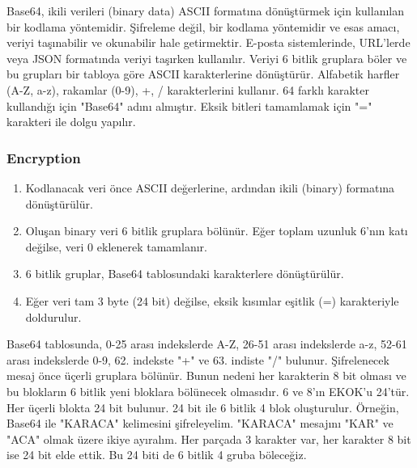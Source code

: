 Base64, ikili verileri (binary data) ASCII formatına dönüştürmek için kullanılan bir kodlama yöntemidir. Şifreleme değil, bir kodlama yöntemidir ve esas amacı, veriyi taşınabilir ve okunabilir hale getirmektir. E-posta sistemlerinde, URL'lerde veya JSON formatında veriyi taşırken kullanılır. Veriyi 6 bitlik gruplara böler ve bu grupları bir tabloya göre ASCII karakterlerine dönüştürür. Alfabetik harfler (A-Z, a-z), rakamlar (0-9), +, / karakterlerini kullanır. 64 farklı karakter kullandığı için "Base64" adını almıştır. Eksik bitleri tamamlamak için "=" karakteri ile dolgu yapılır.

\subsubsection{Encryption}

\begin{enumerate}
    \item Kodlanacak veri önce ASCII değerlerine, ardından ikili (binary) formatına dönüştürülür.
    \item Oluşan binary veri 6 bitlik gruplara bölünür. Eğer toplam uzunluk 6'nın katı değilse, veri 0 eklenerek tamamlanır. 
    \item 6 bitlik gruplar, Base64 tablosundaki karakterlere dönüştürülür.
    \item Eğer veri tam 3 byte (24 bit) değilse, eksik kısımlar eşitlik (=) karakteriyle doldurulur.
\end{enumerate}

Base64 tablosunda, 0-25 arası indekslerde A-Z, 26-51 arası indekslerde a-z, 52-61 arası indekslerde 0-9, 62. indekste "+" ve 63. indiste "/" bulunur. Şifrelenecek mesaj önce üçerli gruplara bölünür. Bunun nedeni her karakterin 8 bit olması ve bu blokların 6 bitlik yeni bloklara bölünecek olmasıdır. 6 ve 8'ın EKOK'u 24'tür. Her üçerli blokta 24 bit bulunur. 24 bit ile 6 bitlik 4 blok oluşturulur. Örneğin, Base64 ile "KARACA" kelimesini şifreleyelim. "KARACA" mesajını "KAR" ve "ACA" olmak üzere ikiye ayıralım. Her parçada 3 karakter var, her karakter 8 bit ise 24 bit elde ettik. Bu 24 biti de 6 bitlik 4 gruba böleceğiz.

\begin{table}[ht]
\centering
{}
\end{table}

